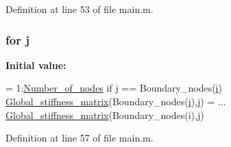 Definition at line 53 of file main.\+m.

\hypertarget{a00008_ac86694252f8dfdb19aaeadc4b7c342c6}{}
\subsubsection[{j}]{\setlength{\rightskip}{0pt plus 5cm}for j}\label{a00008_ac86694252f8dfdb19aaeadc4b7c342c6}
{\bfseries Initial value\+:}
\begin{DoxyCode}
= 1:\hyperlink{a00007_a1d65c23ed4744bf98747671b08490b5c}{Number\_of\_nodes}
        \textcolor{keywordflow}{if} \hyperlink{a00007_abf2bc2545a4a5f5683d9ef3ed0d977e0}{j} == Boundary\_nodes(\hyperlink{a00005_a6dbbc96f4222af2f6c18c8e60f41726b}{i})
            \hyperlink{a00006_a31cdcce530a93925f9b8c6349e94e70b}{Global\_stiffness\_matrix}(Boundary\_nodes(\hyperlink{a00005_a6dbbc96f4222af2f6c18c8e60f41726b}{i}),\hyperlink{a00007_abf2bc2545a4a5f5683d9ef3ed0d977e0}{j}) = ...
            \hyperlink{a00006_a31cdcce530a93925f9b8c6349e94e70b}{Global\_stiffness\_matrix}(Boundary\_nodes(i),\hyperlink{a00007_abf2bc2545a4a5f5683d9ef3ed0d977e0}{j})
\end{DoxyCode}


Definition at line 57 of file main.\+m.

